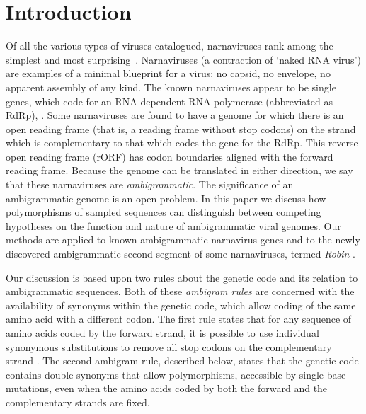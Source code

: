 \documentclass[unnumsec,webpdf,contemporary,large,namedate]{oup-authoring-template}%
\theoremstyle{thmstyleone}%
\theoremstyle{thmstyletwo}%
\theoremstyle{thmstylethree}%
\begin{document}
\maketitle


\section{Introduction}
\label{sec: 1}
Of all the various types of viruses catalogued, narnaviruses rank among the simplest
and most surprising~\citep{Cob+16}.  Narnaviruses (a contraction of \lq naked RNA virus')
are examples of a minimal blueprint for a virus: no capsid, no envelope, no apparent
assembly of any kind. The known narnaviruses appear to be single genes, which code for an
RNA-dependent RNA polymerase
(abbreviated as RdRp), \cite{Hillman2013}. Some narnaviruses
are found to have a genome for which there is an open reading frame (that is, a reading frame without
stop codons) on the strand which is complementary to that which codes the gene for the RdRp.
This reverse open reading frame (rORF) has codon boundaries aligned with the forward reading
frame. Because the genome can be translated in either direction, we say that these narnaviruses
are \emph{ambigrammatic}. The significance of an ambigrammatic genome is an open problem.
In this paper we discuss how polymorphisms of sampled sequences can distinguish
between competing hypotheses on the function and nature of ambigrammatic viral genomes.
Our methods are applied to known ambigrammatic narnavirus genes and to the newly
discovered ambigrammatic second segment of some narnaviruses, termed \emph{Robin} \cite{Bat+20}.

Our discussion is based upon two rules about the genetic code and its relation to ambigrammatic
sequences. Both of these \emph{ambigram rules} are concerned with the availability of synonyms within
the genetic code, which allow coding of the same amino acid with a different codon.
The first rule states that for any sequence of amino acids coded by the forward strand,
it is possible to use individual synonymous substitutions to remove
all stop codons on the complementary strand \citep[this result was discussed already in][]{DeR+19}.
The second ambigram rule, described below, states that the genetic code contains double
synonyms that allow polymorphisms, accessible by single-base mutations, even when the
amino acids coded by both the forward and the complementary strands are fixed.
\end{document}
